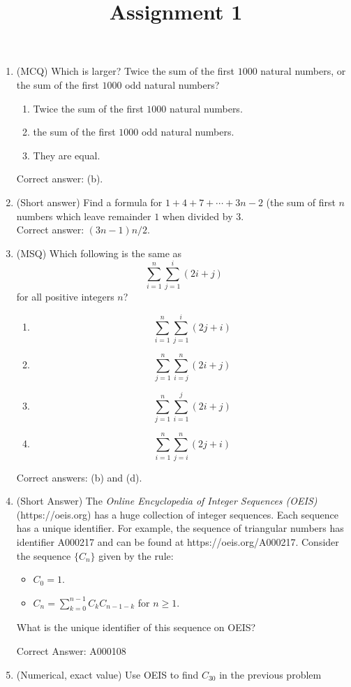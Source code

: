 \documentclass[12pt]{amsart}
\title{Assignment 1}
\begin{document}
\begin{enumerate}
\item (MCQ) Which is larger? Twice the sum of the first $1000$ natural numbers, or the sum of the first $1000$ odd natural numbers?
  \begin{enumerate}
  \item Twice the sum of the first $1000$ natural numbers.
  \item the sum of the first $1000$ odd natural numbers.
  \item They are equal.
  \end{enumerate}
  Correct answer: (b).
\item (Short answer) Find a formula for $1+4+7+\dotsb+3n-2$ (the sum of first $n$ numbers which leave remainder $1$ when divided by $3$.
  \\
  Correct answer: $(3n-1)n/2$.
\item (MSQ) Which following is the same as
  \begin{displaymath}
    \sum_{i=1}^n \sum_{j=1}^i (2i+j)
  \end{displaymath}
  for all positive integers $n$?
  \begin{enumerate}
  \item $$\sum_{i=1}^n \sum_{j=1}^i (2j+i)$$
  \item $$\sum_{j=1}^n \sum_{i=j}^n (2i+j)$$
  \item $$\sum_{j=1}^n \sum_{i=1}^j (2i+j)$$
  \item $$\sum_{i=1}^n \sum_{j=i}^n (2j+i)$$
  \end{enumerate}
  Correct answers: (b) and (d).
\item (Short Answer) The \emph{Online Encyclopedia of Integer Sequences (OEIS)} (https://oeis.org) has a huge collection of integer sequences.
  Each sequence has a unique identifier.
  For example, the sequence of triangular numbers has identifier A000217 and can be found at https://oeis.org/A000217.
  Consider the sequence $\{C_n\}$ given by the rule:
  \begin{itemize}
  \item $C_0=1$.
  \item $C_n = \sum_{k=0}^{n-1} C_k C_{n-1-k}$ for $n\geq 1$.
  \end{itemize}
  What is the unique identifier of this sequence on OEIS?

  Correct Answer: A000108
\item (Numerical, exact value) Use OEIS to find $C_{30}$ in the previous problem
  

\end{enumerate}
\end{document}
